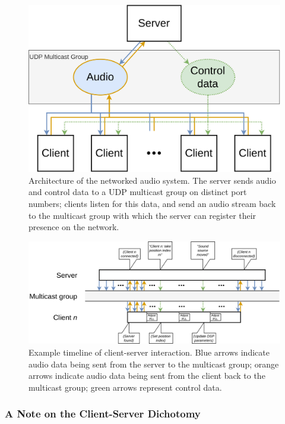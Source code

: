 \begin{figure}[ht]
    \centering
    \includegraphics[width=.75\textwidth]{figures/multicast}
    \caption{Architecture of the networked audio system.
    The server sends audio and control data to a UDP multicast group on
    distinct port numbers; clients listen for this data, and send an audio
    stream back to the multicast group with which the server can register
    their presence on the network.}
    \label{fig:multicast}
\end{figure}

\begin{figure}[ht]
    \centering
    \includegraphics[width=\textwidth]{figures/timeline}
    \caption{Example timeline of client-server interaction. Blue arrows
    indicate audio data being sent from the server to the multicast group;
    orange arrows indicate audio data being sent from the client back to the
    multicast group;
    green arrows represent control data.}
    \label{fig:timeline}
\end{figure}

\subsubsection{A Note on the Client-Server Dichotomy}\label{subsubsec:client-server}

